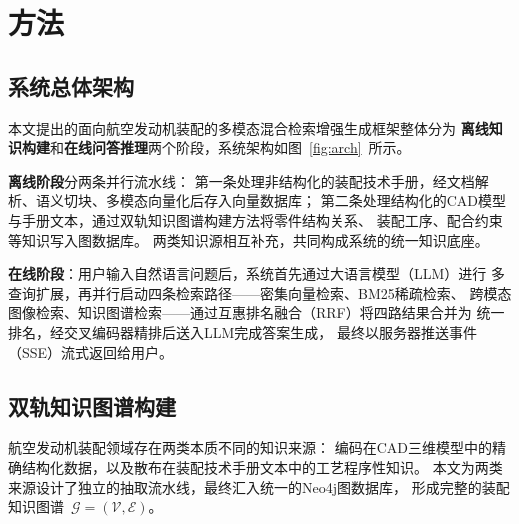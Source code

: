 \section{方法}
\label{sec:method}

\subsection{系统总体架构}
\label{sec:overview}

本文提出的面向航空发动机装配的多模态混合检索增强生成框架整体分为
\textbf{离线知识构建}和\textbf{在线问答推理}两个阶段，系统架构如图~\ref{fig:arch}~所示。

\textbf{离线阶段}分两条并行流水线：
第一条处理非结构化的装配技术手册，经文档解析、语义切块、多模态向量化后存入向量数据库；
第二条处理结构化的CAD模型与手册文本，通过双轨知识图谱构建方法将零件结构关系、
装配工序、配合约束等知识写入图数据库。
两类知识源相互补充，共同构成系统的统一知识底座。

\textbf{在线阶段}：用户输入自然语言问题后，系统首先通过大语言模型（LLM）进行
多查询扩展，再并行启动四条检索路径——密集向量检索、BM25稀疏检索、
跨模态图像检索、知识图谱检索——通过互惠排名融合（RRF）将四路结果合并为
统一排名，经交叉编码器精排后送入LLM完成答案生成，
最终以服务器推送事件（SSE）流式返回给用户。


\subsection{双轨知识图谱构建}
\label{sec:kg}

航空发动机装配领域存在两类本质不同的知识来源：
编码在CAD三维模型中的精确结构化数据，以及散布在装配技术手册文本中的工艺程序性知识。
本文为两类来源设计了独立的抽取流水线，最终汇入统一的Neo4j图数据库，
形成完整的装配知识图谱~$\mathcal{G} = (\mathcal{V}, \mathcal{E})$。

